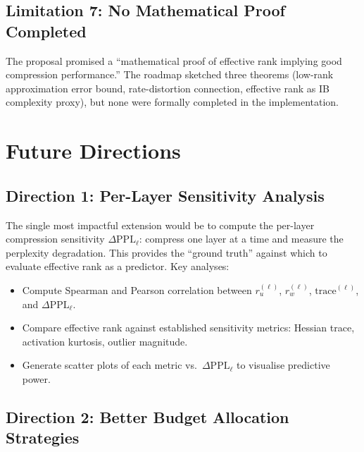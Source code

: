 \documentclass[11pt]{article}
\begin{document}
\subsection{Limitation 7: No Mathematical Proof Completed}

The proposal promised a ``mathematical proof of effective rank implying good compression performance.''  The roadmap sketched three theorems (low-rank approximation error bound, rate-distortion connection, effective rank as IB complexity proxy), but none were formally completed in the implementation.

\section{Future Directions}

\subsection{Direction 1: Per-Layer Sensitivity Analysis}

The single most impactful extension would be to compute the per-layer compression sensitivity $\Delta\text{PPL}_\ell$: compress one layer at a time and measure the perplexity degradation.  This provides the ``ground truth'' against which to evaluate effective rank as a predictor.  Key analyses:
\begin{itemize}
    \item Compute Spearman and Pearson correlation between $r_u^{(\ell)}$, $r_w^{(\ell)}$, $\text{trace}^{(\ell)}$, and $\Delta\text{PPL}_\ell$.
    \item Compare effective rank against established sensitivity metrics: Hessian trace, activation kurtosis, outlier magnitude.
    \item Generate scatter plots of each metric vs.\ $\Delta\text{PPL}_\ell$ to visualise predictive power.
\end{itemize}

\subsection{Direction 2: Better Budget Allocation Strategies}
\end{document}
